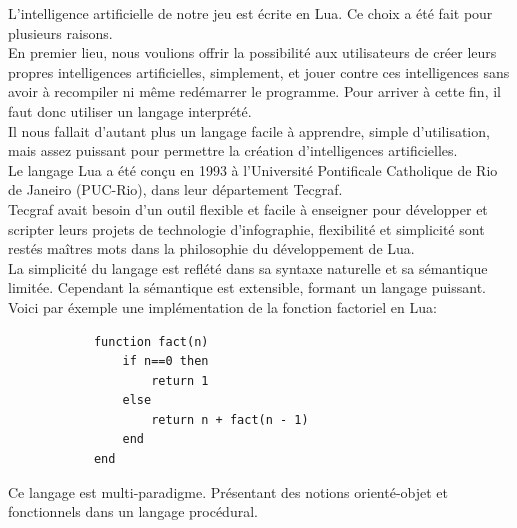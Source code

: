 \documentclass[a4paper]{report}
\begin{document}
		L’intelligence artificielle de notre jeu est écrite en Lua. Ce choix a été fait pour plusieurs raisons.\\
		En premier lieu, nous voulions offrir la possibilité aux utilisateurs de créer leurs propres intelligences artificielles, simplement, et jouer contre ces intelligences sans avoir à 			recompiler ni même redémarrer le programme. Pour arriver à cette fin, il faut donc utiliser un langage interprété.\\
Il nous fallait d’autant plus un langage facile à apprendre, simple d’utilisation, mais assez puissant pour permettre la création d’intelligences artificielles.\\
		Le langage Lua a été conçu en 1993 à l’Université Pontificale Catholique de Rio de Janeiro (PUC-Rio), dans leur département Tecgraf.\\
		Tecgraf avait besoin d’un outil flexible et facile à enseigner pour développer et scripter leurs projets de technologie d’infographie, flexibilité et simplicité sont restés maîtres mots dans la philosophie du développement de Lua.\\
		
		La simplicité du langage est reflété dans sa syntaxe naturelle et sa sémantique limitée. Cependant la sémantique est extensible, formant un langage puissant. Voici par éxemple une implémentation de la fonction factoriel en Lua:\\
		\begin{verbatim}
			function fact(n)
			    if n==0 then
					return 1
			    else
					return n + fact(n - 1)
			    end
			end
		\end{verbatim}
		Ce langage est multi-paradigme. Présentant des notions orienté-objet et fonctionnels dans un langage procédural.\\
\end{document}
